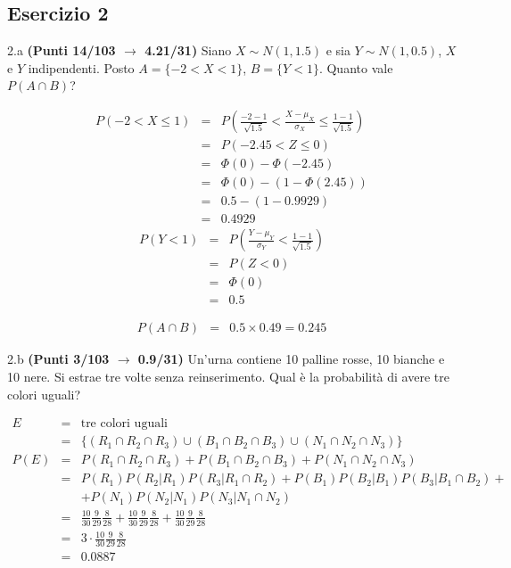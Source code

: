 \documentclass[
  11pt,
]{book}
\theoremstyle{mytheoremstyle}
\theoremstyle{mydefstyle}
\newenvironment{sol}
  {
  \begin{tcolorbox}[enhanced,breakable,arc=0.1mm,boxrule=1pt,colback=white,colframe=iblue,
  title=\bf \fontfamily{lmss}\selectfont \hspace{.5 cm} Soluzione,drop fuzzy shadow]

}{
\end{tcolorbox}
  }
\begin{document}
\subsection{Esercizio 2}\label{esercizio-2-22}

2.a \textbf{(Punti 14/103 \(\rightarrow\) 4.21/31)} Siano \(X\sim N(1,1.5)\) e sia \(Y\sim N(1,0.5)\), \(X\) e \(Y\) indipendenti. Posto \(A=\{-2<X<1\}\), \(B=\{Y<1\}\).
Quanto vale \(P(A\cap B)\)?

\begin{sol}
\begin{eqnarray*}
   P( -2 < X \leq  1 ) &=& P\left( \frac { -2  -  1 }{\sqrt{ 1.5 }} < \frac { X  -  \mu_X }{ \sigma_X } \leq \frac { 1  -  1 }{\sqrt{ 1.5 }}\right)  \\
              &=& P\left(  -2.45  < Z \leq  0 \right) \\
              &=& \Phi( 0 )-\Phi( -2.45 )\\
              &=&  \Phi( 0 )-(1-\Phi( 2.45 )) \\ &=&  0.5 -(1- 0.9929 ) \\ 
              &=&  0.4929 
   \end{eqnarray*}
\begin{eqnarray*}
      P( Y   <   1 ) 
        &=& P\left(  \frac { Y  -  \mu_Y }{ \sigma_Y }  <  \frac { 1  -  1 }{\sqrt{ 1.5 }} \right)  \\
                 &=& P\left(  Z   <   0 \right) \\    
                 &=&  \Phi( 0 ) \\ &=&  0.5 
      \end{eqnarray*}

\begin{eqnarray*}
  P(A\cap B) &=&0.5\times 0.49 = 0.245
\end{eqnarray*}

\end{sol}

2.b \textbf{(Punti 3/103 \(\rightarrow\) 0.9/31)} Un'urna contiene 10 palline rosse, 10 bianche e 10 nere. Si estrae tre volte senza reinserimento. Qual è la probabilità di avere tre colori uguali?

\begin{sol}
\begin{eqnarray*}
  E &=& \text{tre colori uguali}\\
   &=& \{(R_1\cap R_2 \cap R_3)\cup (B_1\cap B_2 \cap B_3)\cup (N_1\cap N_2 \cap N_3)\}\\
P(E) &=& P(R_1\cap R_2 \cap R_3) + P(B_1\cap B_2 \cap B_3) + P(N_1\cap N_2 \cap N_3)\\
&=& P(R_1)P(R_2|R_1)P(R_3|R_1\cap R_2)+P(B_1)P(B_2|B_1)P(B_3|B_1\cap B_2)+\\
& & + P(N_1)P(N_2|N_1)P(N_3|N_1\cap N_2)\\
&=& \frac {10}{30}\frac 9{29}\frac 8{28} + \frac {10}{30}\frac 9{29}\frac 8{28} +\frac {10}{30}\frac 9{29}\frac 8{28} \\
&=& 3\cdot \frac {10}{30}\frac 9{29}\frac 8{28} \\
&=& 0.0887
\end{eqnarray*}

\end{sol}
\end{document}
